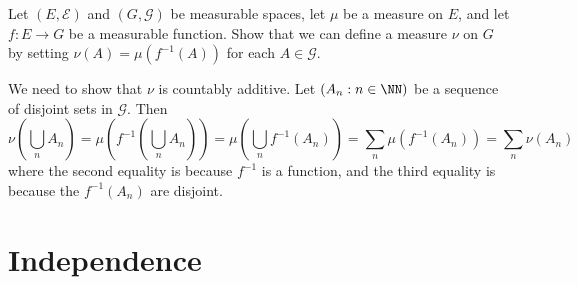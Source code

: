 \documentclass[11pt, headheight=30pt]{scrartcl}
\begin{document}
\begin{prob}
    Let $(E, \mathcal{E})$ and $(G, \mathcal{G})$ be measurable spaces,
    let $\mu$ be a measure on $E$, and let $f: E \to G$ be a measurable
    function. Show that we can define a measure $\nu$ on $G$ by setting
    $\nu(A) = \mu(f^{-1}(A))$ for each $A \in \mathcal{G}$.
\end{prob}
We need to show that $\nu$ is countably additive. Let $(A_n : n\in \NN)$
be a sequence of disjoint sets in $\mathcal{G}$. Then
\[
    \nu\left(\bigcup_n A_n\right) = \mu\left(f^{-1}\left(\bigcup_n A_n\right)\right)
    = \mu\left(\bigcup_n f^{-1}(A_n)\right) = \sum_n \mu(f^{-1}(A_n)) = \sum_n \nu(A_n)
\]
where the second equality is because $f^{-1}$ is a function, and the
third equality is because the $f^{-1}(A_n)$ are disjoint.


\section{Independence}
\end{document}
